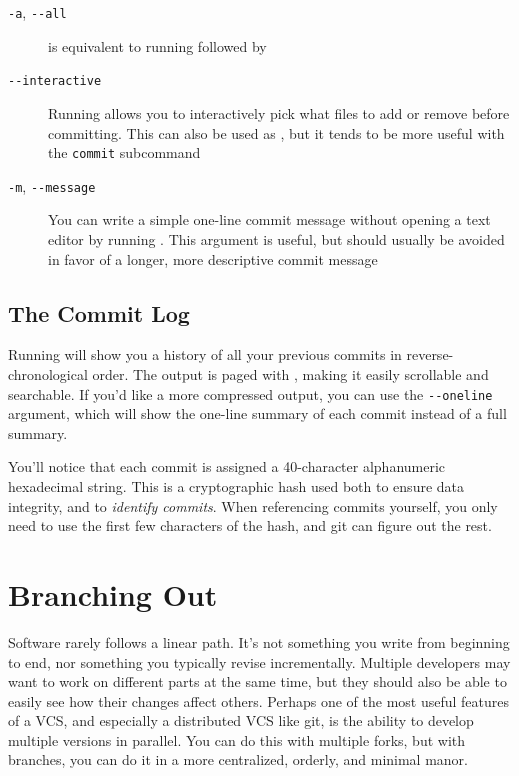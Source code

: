 \documentclass[11pt,letterpaper,twoside]{report}
\begin{document}
\begin{description}
\item[\texttt{-a}, \texttt{-{}-all}]
     is equivalent to running  followed
    by 
\item[\texttt{-{}-interactive}]
    Running  allows you to interactively pick
    what files to add or remove before committing. This can also be used as
    , but it tends to be more useful with the
    \texttt{commit} subcommand
\item[\texttt{-m}, \texttt{-{}-message}]
    You can write a simple one-line commit message without opening a text editor
    by running . This
    argument is useful, but should usually be avoided in favor of a longer, more
    descriptive commit message
\end{description}

\section{The Commit Log}

Running  will show you a history of all your previous commits in
reverse-chronological order. The output is paged with , making it
easily scrollable and searchable. If you'd like a more compressed output, you
can use the \texttt{-{}-oneline} argument, which will show the one-line summary
of each commit instead of a full summary.

You'll notice that each commit is assigned a 40-character alphanumeric
hexadecimal string. This is a cryptographic hash used both to ensure data
integrity, and to \emph{identify commits}. When referencing commits yourself,
you only need to use the first few characters of the hash, and git can figure
out the rest.


\chapter{Branching Out}

Software rarely follows a linear path. It's not something you write from
beginning to end, nor something you typically revise incrementally. Multiple
developers may want to work on different parts at the same time, but they should
also be able to easily see how their changes affect others. Perhaps one of the
most useful features of a VCS, and especially a distributed VCS like git, is the
ability to develop multiple versions in parallel. You can do this with multiple
forks, but with branches, you can do it in a more centralized, orderly, and
minimal manor.
\end{document}
